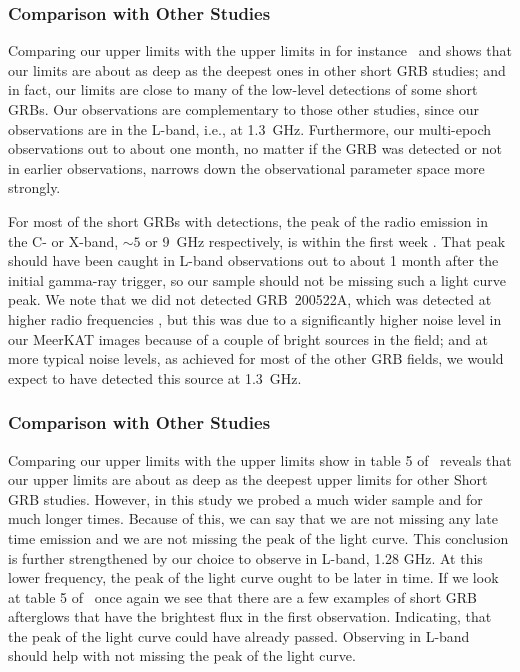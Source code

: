 \documentclass[12pt]{article}
\begin{document}
\subsubsection{Comparison with Other Studies}
Comparing our upper limits with the upper limits in for instance~\citep{2015ApJ...815..102F} and \citet{2021ApJ...906..127F} shows that our limits are about as deep as the deepest ones in other short GRB studies; and in fact, our limits are close to many of the low-level detections of some short GRBs. Our observations are complementary to those other studies, since our observations are in the L-band, i.e., at 1.3~GHz. Furthermore, our multi-epoch observations out to about one month, no matter if the GRB was detected or not in earlier observations, narrows down the observational parameter space more strongly.

For most of the short GRBs with detections, the peak of the radio emission in the C- or X-band, $\sim5$ or 9~GHz respectively, is within the first week \citep{2021ApJ...906..127F}. That peak should have been caught in L-band observations out to about 1 month after the initial gamma-ray trigger, so our sample should not be missing such a light curve peak. We note that we did not detected GRB~200522A, which was detected at higher radio frequencies \citep{2021ApJ...906..127F}, but this was due to a significantly higher noise level in our MeerKAT images because of a couple of bright sources in the field; and at more typical noise levels, as achieved for most of the other GRB fields, we would expect to have detected this source at 1.3~GHz.


\subsubsection{Comparison with Other Studies}
Comparing our upper limits with the upper limits show in table 5 of~\citet{2021ApJ...906..127F} reveals that our upper limits are about as deep as the deepest upper limits for other Short GRB studies. However, in this study we probed a much wider sample and for much longer times. Because of this, we can say that we are not missing any late time emission and we are not missing the peak of the light curve. This conclusion is further strengthened by our choice to observe in L-band, 1.28 GHz. At this lower frequency, the peak of the light curve ought to be later in time. If we look at table 5 of~\citet{2021ApJ...906..127F} once again we see that there are a few examples of short GRB afterglows that have the brightest flux in the first observation. Indicating, that the peak of the light curve could have already passed. Observing in L-band should help with not missing the peak of the light curve. 
\end{document}
